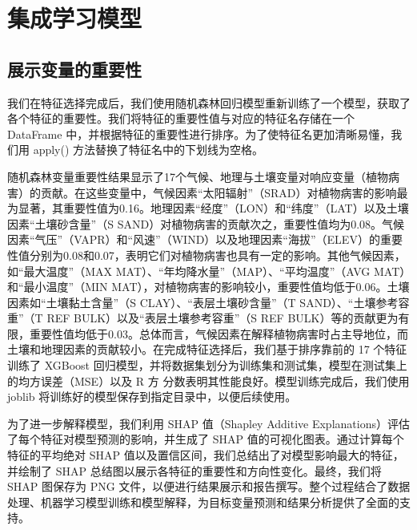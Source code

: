 \documentclass[AutoFakeBold]{LZUThesis-PgD&PhD}
\begin{document}
	
	
%		
%		
	\section{集成学习模型}
	
	\subsection{展示变量的重要性}
	我们在特征选择完成后，我们使用随机森林回归模型重新训练了一个模型，获取了各个特征的重要性。我们将特征的重要性值与对应的特征名存储在一个 DataFrame 中，并根据特征的重要性进行排序。为了使特征名更加清晰易懂，我们用 apply() 方法替换了特征名中的下划线为空格。
	
	随机森林变量重要性结果显示了17个气候、地理与土壤变量对响应变量（植物病害）的贡献。在这些变量中，气候因素“太阳辐射”（SRAD）对植物病害的影响最为显著，其重要性值为0.16。地理因素“经度”（LON）和“纬度”（LAT）以及土壤因素“土壤砂含量”（S SAND）对植物病害的贡献次之，重要性值均为0.08。气候因素“气压”（VAPR）和“风速”（WIND）以及地理因素“海拔”（ELEV）的重要性值分别为0.08和0.07，表明它们对植物病害也具有一定的影响。其他气候因素，如“最大温度”（MAX MAT）、“年均降水量”（MAP）、“平均温度”（AVG MAT）和“最小温度”（MIN MAT），对植物病害的影响较小，重要性值均低于0.06。土壤因素如“土壤黏土含量”（S CLAY）、“表层土壤砂含量”（T SAND）、“土壤参考容重”（T REF BULK）以及“表层土壤参考容重”（S REF BULK）等的贡献更为有限，重要性值均低于0.03。总体而言，气候因素在解释植物病害时占主导地位，而土壤和地理因素的贡献较小。在完成特征选择后，我们基于排序靠前的 17 个特征训练了 XGBoost 回归模型，并将数据集划分为训练集和测试集，模型在测试集上的均方误差（MSE）以及 R 方 分数表明其性能良好。模型训练完成后，我们使用 joblib 将训练好的模型保存到指定目录中，以便后续使用。
	
	为了进一步解释模型，我们利用 SHAP 值（Shapley Additive Explanations）评估了每个特征对模型预测的影响，并生成了 SHAP 值的可视化图表。通过计算每个特征的平均绝对 SHAP 值以及置信区间，我们总结出了对模型影响最大的特征，并绘制了 SHAP 总结图以展示各特征的重要性和方向性变化。最终，我们将 SHAP 图保存为 PNG 文件，以便进行结果展示和报告撰写。整个过程结合了数据处理、机器学习模型训练和模型解释，为目标变量预测和结果分析提供了全面的支持。
	
\end{document}
